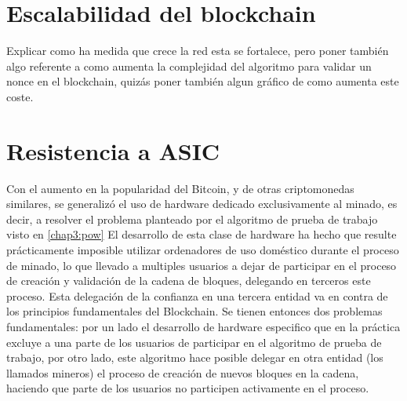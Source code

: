 \section{Escalabilidad del blockchain}

Explicar como ha medida que crece la red esta se fortalece, pero poner también algo referente a como aumenta la complejidad del algoritmo para validar un nonce en el blockchain, quizás poner también algun gráfico de como aumenta este coste.


\section{Resistencia a ASIC}
Con el aumento en la popularidad del Bitcoin, y de otras criptomonedas similares, se generalizó el uso de hardware dedicado exclusivamente al minado, es decir, a resolver el problema planteado por el algoritmo de prueba de trabajo visto en \ref{chap3:pow} El desarrollo de esta clase de hardware ha hecho que resulte prácticamente imposible utilizar ordenadores de uso doméstico durante el proceso de minado, lo que llevado a multiples usuarios a dejar de participar en el proceso de creación y validación de la cadena de bloques, delegando en terceros este proceso. Esta delegación de la confianza en una tercera entidad va en contra de los principios fundamentales del Blockchain. Se tienen entonces dos problemas fundamentales: por un lado el desarrollo de hardware especifico que en la práctica excluye a una parte de los usuarios de participar en el algoritmo de prueba de trabajo, por otro lado, este algoritmo hace posible delegar en otra entidad (los llamados mineros) el proceso de creación de nuevos bloques en la cadena, haciendo que parte de los usuarios no participen activamente en el proceso.
\begin{figure}[H]
  \qquad
	\label{fig:test}%
\end{figure}
